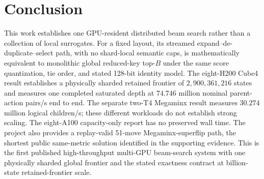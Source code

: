 \documentclass[10pt,twocolumn]{article}
\begin{document}
\section{Conclusion}
This work establishes one GPU-resident distributed beam search rather than a
collection of local surrogates.  For a fixed layout, its streamed
expand--de-duplicate--select path, with no shard-local semantic caps, is
mathematically equivalent to monolithic global reduced-key top-$B$ under the
same score quantization, tie order, and stated 128-bit identity model.  The
eight-H200 Cube4 result establishes a physically sharded retained frontier of
$2{,}900{,}361{,}216$ states and measures one completed saturated depth at
$74.746$ million nominal parent-action pairs/s end to end. The separate two-T4
Megaminx result measures $30.274$ million logical children/s; these different
workloads do not establish strong scaling. The eight-A100 capacity-only report
has no preserved wall time. The project also provides a replay-valid
51-move Megaminx-superflip path, the shortest public same-metric solution
identified in the supporting evidence.  This is the first published
high-throughput multi-GPU beam-search system with one physically sharded global
frontier and the stated exactness contract at billion-state retained-frontier
scale.

\clearpage
\begingroup
\footnotesize


\endgroup
\end{document}
